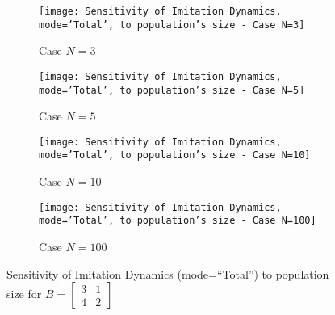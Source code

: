 	\begin{figure}[h]
		\centering
		\begin{subfigure}[t]{.49\textwidth}
			\centering
			\texttt{[image: Sensitivity of Imitation Dynamics, mode='Total', to population's size - Case N=3]}
			\caption{Case $N=3$}
			\label{fig:example26}
		\end{subfigure}
		\begin{subfigure}[t]{.49\textwidth}
			\centering
			\texttt{[image: Sensitivity of Imitation Dynamics, mode='Total', to population's size - Case N=5]}
			\caption{Case $N=5$}
			\label{fig:example27}
		\end{subfigure}
		\begin{subfigure}[t]{.49\textwidth}
			\centering
			\texttt{[image: Sensitivity of Imitation Dynamics, mode='Total', to population's size - Case N=10]}
			\caption{Case $N=10$}
			\label{fig:example28}
		\end{subfigure}
		\begin{subfigure}[t]{.49\textwidth}
			\centering
			\texttt{[image: Sensitivity of Imitation Dynamics, mode='Total', to population's size - Case N=100]}
			\caption{Case $N=100$}
			\label{fig:example29}
		\end{subfigure}
		\caption{Sensitivity of Imitation Dynamics (mode=``Total'') to population size for $B = \begin{bmatrix} 3 & 1 \\ 4 & 2 \end{bmatrix}$}
		\label{fig:Sensitivity of Imitation Dynamics, mode='Total', to population's size}
	\end{figure}
	
